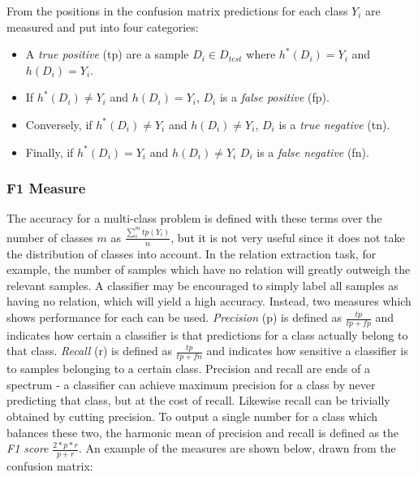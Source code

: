 \begin{center}
\end{center}

From the positions in the confusion matrix predictions for each class $Y_i$ are measured and put into four categories: 

\begin{itemize}
\item A \emph{true positive} (tp) are a sample $D_i \in D_{test}$ where $h^*(D_i) = Y_i$ and $h(D_i) = Y_i$. 
\item If $h^*(D_i) \neq Y_i$ and $h(D_i) = Y_i$, $D_i$ is a \emph{false positive} (fp). 
\item Conversely, if $h^*(D_i) \neq Y_i$ and $h(D_i) \neq Y_i$, $D_i$ is a \emph{true negative} (tn).
\item Finally, if $h^*(D_i) = Y_i$ and $h(D_i) \neq Y_i$ $D_i$ is a \emph{false negative} (fn).\\ 
\end{itemize}

\subsubsection{F1 Measure}
\label{sec:f1measure}
The accuracy for a multi-class problem is defined with these terms over the number of classes $m$ as $\frac{\sum_{i}^{m} tp(Y_i)}{n} $, but it is not very useful since it does not take the distribution of classes into account. In the relation extraction task, for example, the number of samples which have no relation will greatly outweigh the relevant samples. A classifier may be encouraged to simply label all samples as having no relation, which will yield a high accuracy. Instead, two measures which shows performance for each can be used. \emph{Precision} (p) is defined as $\frac{tp} {tp+fp}$ and indicates how certain a classifier is that predictions for a class actually belong to that class. \emph{Recall} (r) is defined as $\frac{tp}{tp+fn}$ and indicates how sensitive a classifier is to samples belonging to a certain class. Precision and recall are ends of a spectrum - a classifier can achieve maximum precision for a class by never predicting that class, but at the cost of recall. Likewise recall can be trivially obtained by cutting precision. To output a single number for a class which balances these two, the harmonic mean of precision and recall is defined as the \emph{F1 score} $\frac{2 * p * r}{p + r}$. An example of the measures are shown below, drawn from the confusion matrix:

